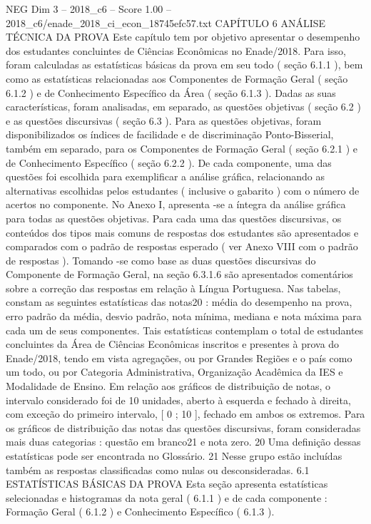 \begin{textsample}{NEG Dim 3 – 2018\_c6 – Score 1.00 – 2018\_c6/enade\_2018\_ci\_econ\_18745efc57.txt}  \label{ex:f3_neg_170}
CAPÍTULO 6 ANÁLISE TÉCNICA DA PROVA Este capítulo tem por objetivo apresentar o desempenho dos estudantes concluintes de Ciências Econômicas no Enade/2018.
Para isso, foram calculadas as estatísticas básicas da prova em seu todo ( seção 6.1.1 ), bem como as estatísticas relacionadas aos Componentes de Formação Geral ( seção 6.1.2 ) e de Conhecimento Específico da Área ( seção 6.1.3 ).
Dadas as suas características, foram analisadas, em separado, as questões objetivas ( seção 6.2 ) e as questões discursivas ( seção 6.3 ).
Para as questões objetivas, foram disponibilizados os índices de facilidade e de discriminação Ponto-Bisserial, também em separado, para os Componentes de Formação Geral ( seção 6.2.1 ) e de Conhecimento Específico ( seção 6.2.2 ).
De cada componente, uma das questões foi escolhida para exemplificar a análise gráfica, relacionando as alternativas escolhidas pelos estudantes ( inclusive o gabarito ) com o número de acertos no componente.
No Anexo I, apresenta -se a íntegra da análise gráfica para todas as questões objetivas.
Para cada uma das questões discursivas, os conteúdos dos tipos mais comuns de respostas dos estudantes são apresentados e comparados com o padrão de respostas esperado ( ver Anexo VIII com o padrão de respostas ).
Tomando -se como base as duas questões discursivas do Componente de Formação Geral, na seção 6.3.1.6 são apresentados comentários sobre a correção das respostas em relação à Língua Portuguesa.
Nas tabelas, constam as seguintes estatísticas das notas20 : média do desempenho na prova, erro padrão da média, desvio padrão, nota mínima, mediana e nota máxima para cada um de seus componentes.
Tais estatísticas contemplam o total de estudantes concluintes da Área de Ciências Econômicas inscritos e presentes à prova do Enade/2018, tendo em vista agregações, ou por Grandes Regiões e o país como um todo, ou por Categoria Administrativa, Organização Acadêmica da IES e Modalidade de Ensino.
Em relação aos gráficos de distribuição de notas, o intervalo considerado foi de 10 unidades, aberto à esquerda e fechado à direita, com exceção do primeiro intervalo, [ 0 ; 10 ], fechado em ambos os extremos.
Para os gráficos de distribuição das notas das questões discursivas, foram consideradas mais duas categorias : questão em branco21 e nota zero. 20 Uma definição dessas estatísticas pode ser encontrada no Glossário. 21 Nesse grupo estão incluídas também as respostas classificadas como nulas ou desconsideradas. 6.1 ESTATÍSTICAS BÁSICAS DA PROVA Esta seção apresenta estatísticas selecionadas e histogramas da nota geral ( 6.1.1 ) e de cada componente : Formação Geral ( 6.1.2 ) e Conhecimento Específico ( 6.1.3 ).

\end{textsample}
